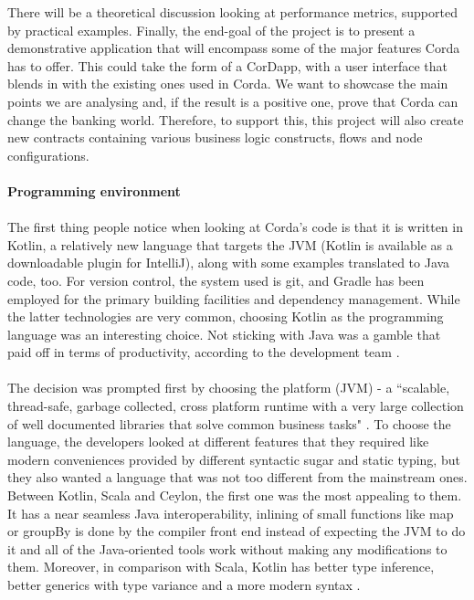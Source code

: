 \documentclass[12pt,twoside]{article}
\begin{document}
There will be a theoretical discussion looking at performance metrics, supported by practical examples. Finally, the end-goal of the project is to present a demonstrative application that will encompass some of the major features Corda has to offer. This could take the form of a CorDapp, with a user interface that blends in with the existing ones used in Corda. We want to showcase the main points we are analysing and, if the result is a positive one, prove that Corda can change the banking world. Therefore, to support this, this project will also create new contracts containing various business logic constructs, flows and node configurations.
\\ \\
\textbf{Programming environment} 
\\ \\
The first thing people notice when looking at Corda's code is that it is written in Kotlin, a relatively new language that targets the JVM (Kotlin is available as a downloadable plugin for IntelliJ), along with some examples translated to Java code, too. For version control, the system used is git, and Gradle has been employed for the primary building facilities and dependency management. While the latter technologies are very common, choosing Kotlin as the programming language was an interesting choice. Not sticking with Java was a gamble that paid off in terms of productivity, according to the development team \cite{kotlin}.
\\ \\
The decision was prompted first by choosing the platform (JVM) - a ``scalable, thread-safe, garbage collected, cross platform runtime with a very large collection of well documented libraries that solve common business tasks" \cite{kotlin}. To choose the language, the developers looked at different features that they required like modern conveniences provided by different syntactic sugar and static typing, but they also wanted a language that was not too different from the mainstream ones. Between Kotlin, Scala and Ceylon, the first one was the most appealing to them. It has a near seamless Java interoperability, inlining of small functions like map or groupBy is done by the compiler front end instead of expecting the JVM to do it and all of the Java-oriented tools work without making any modifications to them. Moreover, in comparison with Scala, Kotlin has better type inference, better generics with type variance and a more modern syntax \cite{whykotlin}. 
\\ \\
\end{document}
